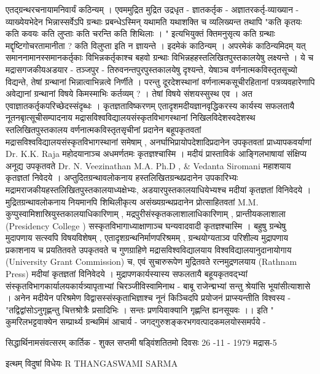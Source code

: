 एतद्ग्रन्थरचनायामनिवार्यं कठिन्यम् ।
एवममुद्रित मुद्रित उद्रधृत - ज्ञातकर्तृक - अज्ञातरकर्तृ-व्याख्यान - व्याख्येयभेदेन भिन्नास्सर्वेऽपि ग्रन्थाः प्रबन्धेऽस्मिन् यथामति यथाशक्ति च व्यलिख्यन्त तथापि 
"कति कृतयः कति कवयः कति लुप्ताः कति चरन्ति कति शिथिलाः । "
इत्यभियुक्तं क्तिमनुसृत्य कति ग्रन्थाः मद्दृष्टिगोचरतामानीता ? कति विलुप्ता इति न ज्ञायन्ते । इदमेकं काठिन्यम् । अपरमेकं काठिन्यमिदम् यत् समाननामानस्समानकर्तृकाः विभिन्नकर्तृकाश्च बहवो ग्रन्थाः विभिन्नहहस्तलिखितपुस्तकालयेषु लक्ष्यन्ते । ये च मद्रासगजकीयअडयार - तञ्जपुर - तिरुवनन्तपुरपुस्तकालयेषु दृश्यन्ते, येषाञ्च वर्णनात्मकविस्तृतसूच्यो विद्यन्ते, तेषां ग्रन्थानां भिन्नात्वाभिन्नत्वे निर्णीते । परन्तु दूरदेशस्थानां वर्णनात्मकसूचीरहितानां पत्रव्यवहारेणापि अवेद्यानां ग्रन्थानां विषये किमस्माभिः कर्तव्यम् ? । तेषां विषये संशयस्सुस्थ एव । अत एवाज्ञातकर्तृकपरिच्छेदस्संदृब्धः । 
कृतज्ञताविष्करणम् 
एतादृशमदीयज्ञानवृद्धिकरस्य कार्यस्य सफलतायै नूतनबृात्सूचीसम्पादनाय मद्रासविश्वविद्यालयसंस्कृतविभागस्थानां निखिलविदेशस्वदेशस्थ स्तलिखितपुस्तकालय वर्णनात्मकविस्तृतसृचीनां प्रदानेन बहूपकृतवतां मद्रासविश्वविद्यालयसंस्कृतविभागस्थानां समेषाम् , अनर्घाभिप्रायोपदेशादिप्रदानेन उपकृतवतां प्राध्यापकवर्याणां Dr. K.K. Raja महोदयानाञ्च अधमर्णतमः कृतज्ञश्चास्मि ।
मदीयं प्रास्ताविकं आङ्गिलभाषायां संक्षिप्य अनूद्य उपकृतवते Dr. N. Veezinathan M.A. Ph.D , \& Vedanta Siromani महाशयाय कृतज्ञतां निवेदये । 
अप्तुदितग्रन्थावलोकनाय हस्तलिखितग्रन्थप्रदानेन उपकारिभ्यः मद्रामराजकीयहस्तलिखितपुस्तकालयाध्यक्षेभ्यः, अडयारपुस्तकालयाधियेभ्यश्च मदीयां कृतज्ञतां विनिवेदये । 
मुद्रितग्रन्थावलोकनाय नियमानपि शिथिलीकृत्य असंख्यग्रन्थप्रदानेन प्रोत्साहितवतां M.M. कुप्पुस्वामिशास्रियुस्तकालयाधिकारिणाम् , मद्रपुरीसंस्कृतकलाशालाधिकारिणाम् , प्रान्तीयकलाशाला (Presidency College ) सस्कृतविभागाध्याक्षाणाञ्च घन्यवादवादी कृतज्ञश्चास्मि । 
बहुषु ग्रन्थेषु मुदापणाय सत्स्वपि विषयविशेषम् , एतादृशग्रन्थनिर्माणपरिश्रमम् , ग्रन्थयोग्यताञ्व परिशील्य मुद्रापणाय प्रकाशनाय च प्रयतितवते उपकृतवते च गुणग्राहिणे मद्रासविश्वविद्यालयाय विश्वविद्यालयानुदानायोगाय (University Grant Commission) च, एवं सुचारुरूपेण मुद्रितवते रत्नमुद्रणलयाय (Rathnam Press) मदीयां कृतज्ञतां विनिवेदये । मुद्रापणकार्यस्यास्य सफलतायै बहूयकृतवद्भ्यां संस्कृतविभागकार्यालयकार्यत्र्यापृताभ्यां चिरञ्जीविस्वामिनाथ - बाबू राजेन्द्मभ्यां सन्तु श्रेयांसि भूयांसीत्याशासे । 
अनेन मदीयेन परिश्रमेण विद्वासस्संस्कृताभिज्ञाश्च नूनं किञ्चिदपि प्रयोजनं प्राप्स्यन्तीति विश्वस्य - 
"तद्विद्वांसोऽनुगृह्णन्तु चित्तश्रोत्रैः प्रसादिभिः । 
सन्तः प्रणयिवाक्यानि गृह्णन्ति ह्यनसूयवः ।। इति "
कुमरिलभट्टवाक्येन सम्प्रार्थ्य ग्रन्थमिमं आचार्य - जगद्गुरुशङ्करभगवत्पादकमलयोस्समर्पये - 

सिद्धार्थिनामसंवत्सरम् 
कार्तिक - शुक्ल सप्तमी
षड्विंशतितमो दिवसः 
26 -11 - 1979 
मद्रास-5

इत्थम् 
विदुषां विधेयः 
R THANGASWAMI SARMA


